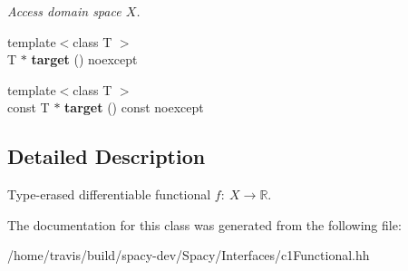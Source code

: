 \begin{DoxyCompactItemize}
\begin{DoxyCompactList}\small\item\em Access domain space $X$. \end{DoxyCompactList}\item 
\hypertarget{classSpacy_1_1C1Functional_adf7c0fc5a81009ebf4f8c5d9bdb9ec98}{{\footnotesize template$<$class T $>$ }\\T $\ast$ {\bfseries target} () noexcept}\label{classSpacy_1_1C1Functional_adf7c0fc5a81009ebf4f8c5d9bdb9ec98}

\item 
\hypertarget{classSpacy_1_1C1Functional_aa016d1671e43b875064cf3d9d9bb6351}{{\footnotesize template$<$class T $>$ }\\const T $\ast$ {\bfseries target} () const noexcept}\label{classSpacy_1_1C1Functional_aa016d1671e43b875064cf3d9d9bb6351}

\end{DoxyCompactItemize}


\subsection{Detailed Description}
Type-\/erased differentiable functional $f:\ X \to \mathbb{R} $. 

The documentation for this class was generated from the following file\-:\begin{DoxyCompactItemize}
\item 
/home/travis/build/spacy-\/dev/\-Spacy/\-Interfaces/c1\-Functional.\-hh\end{DoxyCompactItemize}
